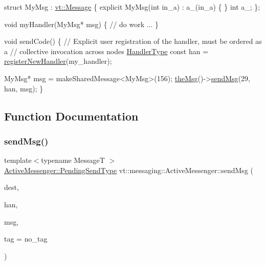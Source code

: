 \begin{DoxyCode}
\textcolor{keyword}{struct }MyMsg : \hyperlink{structvt_1_1messaging_1_1_active_msg}{vt::Message} \{
  \textcolor{keyword}{explicit} MyMsg(\textcolor{keywordtype}{int} in\_a) : a\_(in\_a) \{ \}
  \textcolor{keywordtype}{int} a\_;
\};

\textcolor{keywordtype}{void} myHandler(MyMsg* msg) \{
  \textcolor{comment}{// do work ...}
\}

\textcolor{keywordtype}{void} sendCode() \{
  \textcolor{comment}{// Explicit user registration of the handler, must be ordered as a}
  \textcolor{comment}{// collective invocation across nodes}
  \hyperlink{namespacevt_af64846b57dfcaf104da3ef6967917573}{HandlerType} \textcolor{keyword}{const} han = \hyperlink{structvt_1_1messaging_1_1_active_messenger_a018435c71415f6f10dc578230397a85c}{registerNewHandler}(my\_handler);

  MyMsg* msg = makeSharedMessage<MyMsg>(156);
  \hyperlink{namespacevt_aeafd31f866aeb4dc6fc2f6ee97136350}{theMsg}()->\hyperlink{group__preregister_gaebfcd932babb3be0ea8d481f655a2835}{sendMsg}(29, han, msg);
\}
\end{DoxyCode}
 

\subsection{Function Documentation}
\mbox{\label{group__preregister_gaebfcd932babb3be0ea8d481f655a2835}} 
\subsubsection{\texorpdfstring{send\+Msg()}{sendMsg()}\hspace{0.1cm}{\footnotesize\ttfamily [1/2]}}
{\footnotesize\ttfamily template$<$typename MessageT $>$ \\
\hyperlink{structvt_1_1messaging_1_1_active_messenger_a3626a6ca76d8ad4ec7c3b47a2c70d3a8}{Active\+Messenger\+::\+Pending\+Send\+Type} vt\+::messaging\+::\+Active\+Messenger\+::send\+Msg (\begin{DoxyParamCaption}\item[{\hyperlink{namespacevt_a866da9d0efc19c0a1ce79e9e492f47e2}{Node\+Type}}]{dest,  }\item[{\hyperlink{namespacevt_af64846b57dfcaf104da3ef6967917573}{Handler\+Type}}]{han,  }\item[{MessageT $\ast$}]{msg,  }\item[{\hyperlink{namespacevt_a84ab281dae04a52a4b243d6bf62d0e52}{Tag\+Type}}]{tag = {\ttfamily no\+\_\+tag} }\end{DoxyParamCaption})}



